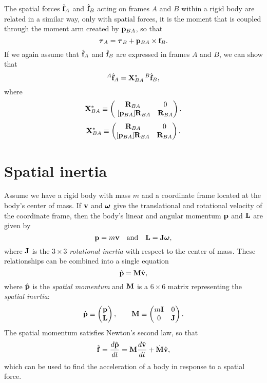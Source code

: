 The spatial forces $\hat{{\bf f}}_A$ and $\hat{{\bf f}}_B$ acting on frames $A$ and
$B$ within a rigid body are related in a similar way, only with
spatial forces, it is the moment that is coupled through the moment
arm created by ${\bf p}_{BA}$, so that
%
\begin{equation*}
\boldsymbol\tau_{A} = \boldsymbol\tau_{B} + {\bf p}_{BA} \times {\bf f}_{B}.
\end{equation*}
%
If we again assume that $\hat{{\bf f}}_A$ and $\hat{{\bf f}}_B$
are expressed in frames $A$ and $B$, we can show that
%
\begin{equation}
{}^A\hat{{\bf f}}_A = {\bf X}^*_{BA} \, {}^B\hat{{\bf f}}_B,
\end{equation}
%
where
%
\iflatexml
\begin{equation}
{\bf X}^*_{BA} \equiv 
\left(\begin{matrix} {\bf R}_{BA} & 0 \\  ~[{\bf p}_{BA}]{\bf R}_{BA} & {\bf R}_{BA} \end{matrix}\right). 
\label{XforceAB:eqn}
\end{equation}
\else
\begin{equation}
\X^*_{BA} \equiv
\matl \R_{BA} & 0 \\  [\p_{BA}] \R_{BA} & \R_{BA} \matr.
\label{XforceAB:eqn}
\end{equation}
\fi


\section{Spatial inertia}
\label{SpatialInertia:sec}

Assume we have a rigid body with mass $m$ and a coordinate frame
located at the body's center of mass.  If ${\bf v}$ and $\boldsymbol\omega$ give the
translational and rotational velocity of the coordinate frame, then
the body's linear and angular momentum ${\bf p}$ and ${\bf L}$ are given by
%
\begin{equation}
{\bf p} = m {\bf v} \quad \text{and} \quad {\bf L} = {\bf J} \boldsymbol\omega,
\label{momenta:eqn}
\end{equation}
%
where ${\bf J}$ is the $3 \times 3$ {\it rotational inertia} with respect
to the center of mass. These relationships can be combined into a
single equation
%
\begin{equation}
\hat{{\bf p}} = {\bf M} \hat{{\bf v}},
\label{momentum:eqn}
\end{equation}
%
where $\hat{{\bf p}}$ is the {\it spatial momentum} and ${\bf M}$ is a $6 \times 6$
matrix representing the {\it spatial inertia}:
%
\begin{equation}
\hat{{\bf p}} \equiv \left(\begin{matrix} {\bf p} \\ {\bf L} \end{matrix}\right), \qquad
{\bf M} \equiv \left(\begin{matrix} m {\bf I} & 0 \\ 0 & {\bf J} \end{matrix}\right).
\end{equation}
%
The spatial momentum satisfies Newton's second law, so that
%
\begin{equation}
\hat{{\bf f}} = \frac{d \hat{{\bf p}}}{dt} = {\bf M} \frac{d \hat{{\bf v}}}{dt} + \dot{{\bf M}} \hat{{\bf v}},
\end{equation}
%
which can be used to find the acceleration of a body in response to a
spatial force.

